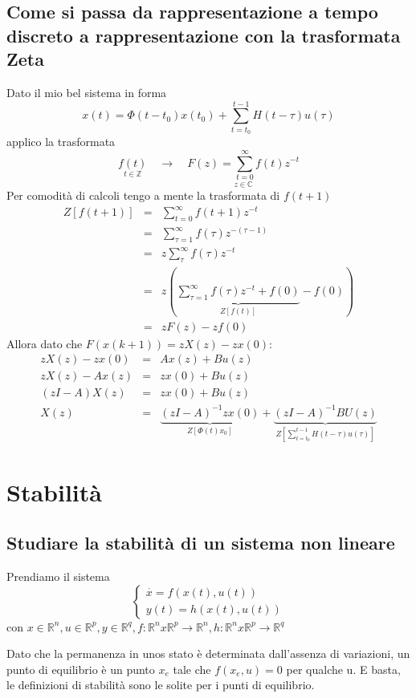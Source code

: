 \documentclass{article}
\begin{document}
\subsection{Come si passa da rappresentazione a tempo discreto a rappresentazione con la trasformata Zeta}

Dato il mio bel sistema in forma
\[
    x(t) = \Phi(t-t_0)x(t_0)+\sum_{t=t_0}^{t-1}H(t-\tau)u(\tau)
\]
applico la trasformata
\[
    \underset{t\in\mathbb{Z}}{f(t)}\quad\to\quad
    \underset{z\in\mathbb{C}}{F(z)=\sum_{t=0}^{\infty}f(t)z^{-t}}
\]
Per comodità di calcoli tengo a mente la trasformata di $f(t+1)$
\begin{align*}
    Z[f(t+1)] &=&\sum_{t=0}^{\infty}f(t+1)z^{-t}\\
    &=&\sum_{\tau=1}^{\infty}f(\tau)z^{-(\tau-1)}\\
    &=&z\sum_{\tau}^{\infty}f(\tau)z^{-t}\\
    &=&z\left( \underbrace{\sum_{\tau=1}^{\infty}f(\tau) z^{-t}+f(0)}_{Z[f(t)]}-f(0) \right)\\
    &=&zF(z)-zf(0)
\end{align*}
Allora dato che $F(x(k+1)) = zX(z)-zx(0)$:
\begin{align*}
    zX(z)-zx(0) &=& Ax(z)+Bu(z)\\
    zX(z)-Ax(z) &=& zx(0)+Bu(z)\\
    (zI-A)X(z) &=& zx(0)+Bu(z)\\
    X(z) &=& \underbrace{(zI-A)^{-1}zx(0)}_{Z[\Phi(t)x_0]}+
    \underbrace{(zI-A)^{-1}BU(z)}_{Z[\sum_{t=t_0}^{t-1}H(t-\tau)u(\tau)]}
\end{align*}


\section{Stabilità}

\subsection{Studiare la stabilità di un sistema non lineare}
Prendiamo il sistema 
\[
\begin{cases}
    \overset{\cdot}{x} = f(x(t),u(t))\\
    y(t) = h(x(t),u(t))
\end{cases}    
\]
con $x\in\mathbb{R}^n,u\in\mathbb{R}^p,y\in\mathbb{R}^q,f:\mathbb{R}^nx\mathbb{R}^p\to\mathbb{R}^n,h:\mathbb{R}^nx\mathbb{R}^p\to\mathbb{R}^q$

Dato che la permanenza in unos stato è determinata dall'assenza di variazioni, un punto di equilibrio
è un punto $x_e$ tale che $f(x_e,u) = 0$ per qualche u.
E basta, le definizioni di stabilità sono le solite per i punti di equilibrio.
\end{document}
